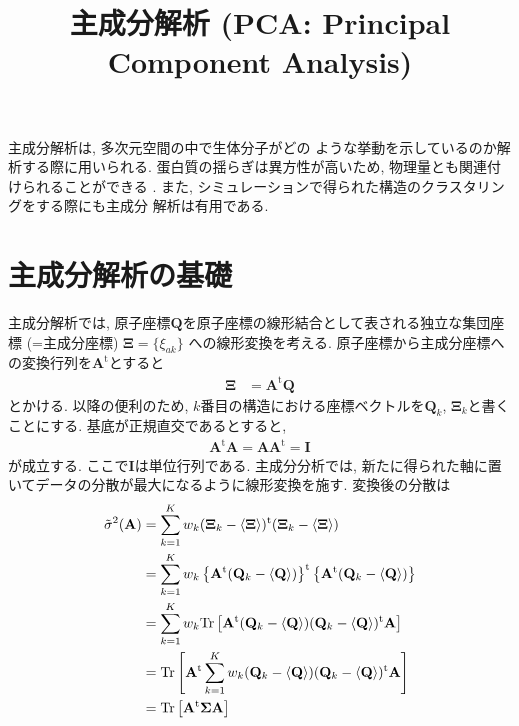 





\title{主成分解析 (PCA: Principal Component Analysis)}
\maketitle

主成分解析\cite{1981Karplus}は, 多次元空間の中で生体分子がどの
ような挙動を示しているのか解析する際に用いられる.
蛋白質の揺らぎは異方性が高いため, 物理量とも関連付けられることができる
\cite{1991Kitao, 1999Kitao, 2001Kitao}.
また, シミュレーションで得られた構造のクラスタリングをする際にも主成分
解析は有用である.

\section{主成分解析の基礎}
主成分解析では, 原子座標$\mathbf{Q}$を原子座標の線形結合として表される独立な集団座標 (=主成分座標) $\mathbf{\Xi} = \{\xi_{ak}\}$ への線形変換を考える.
原子座標から主成分座標への変換行列を$\mathbf{A}^{\mathrm{t}}$とすると
\begin{align}
  \mathbf{\Xi} &= \mathbf{A}^{\mathrm{t}} \mathbf{Q}
\end{align}
とかける.
以降の便利のため, $k$番目の構造における座標ベクトルを$\mathbf{Q}_{k}$, $\mathbf{\Xi}_{k}$と書くことにする.
基底が正規直交であるとすると,
\begin{align}
  \mathbf{A}^{\mathrm{t}} \mathbf{A} =
  \mathbf{A} \mathbf{A}^{\mathrm{t}} =
  \mathbf{I}
\end{align}
が成立する.
ここで$\mathbf{I}$は単位行列である.
主成分分析では, 新たに得られた軸に置いてデータの分散が最大になるように線形変換を施す.
変換後の分散は
\begin{align}
  \Tilde{\sigma}^{2} (\mathbf{A}) &=
  \sum_{k=1}^{K} w_{k}
  (\mathbf{\Xi}_{k} - \langle \mathbf{\Xi} \rangle)^{\mathrm{t}}
  (\mathbf{\Xi}_{k} - \langle \mathbf{\Xi} \rangle)
  \notag
  \\
  &=
  \sum_{k=1}^{K} w_{k}
  \left\{
         \mathbf{A}^{\mathrm{t}}
         (\mathbf{Q}_{k} - \langle \mathbf{Q} \rangle)
  \right\}^{\mathrm{t}}
  \left\{
         \mathbf{A}^{\mathrm{t}}
         (\mathbf{Q}_{k} - \langle \mathbf{Q} \rangle)
  \right\}
  \notag
  \\
  &=
  \sum_{k=1}^{K} w_{k}
  \mathrm{Tr}
  \left[
        \mathbf{A}^{\mathrm{t}}
        (\mathbf{Q}_{k} - \langle \mathbf{Q} \rangle)
        (\mathbf{Q}_{k} - \langle \mathbf{Q} \rangle)^{\mathrm{t}}
        \mathbf{A}
  \right]
  \notag
  \\
  &=
  \mathrm{Tr}
  \left[
        \mathbf{A}^{\mathrm{t}}
        \sum_{k=1}^{K} w_{k}
        (\mathbf{Q}_{k} - \langle \mathbf{Q} \rangle)
        (\mathbf{Q}_{k} - \langle \mathbf{Q} \rangle)^{\mathrm{t}}
        \mathbf{A}
  \right]
  \notag
  \\
  &=
  \mathrm{Tr}
  \left[
        \mathbf{A}^{\mathrm{t}}
        \mathbf{\Sigma}
        \mathbf{A}
  \right]
  \label{eq:variance}
\end{align}
